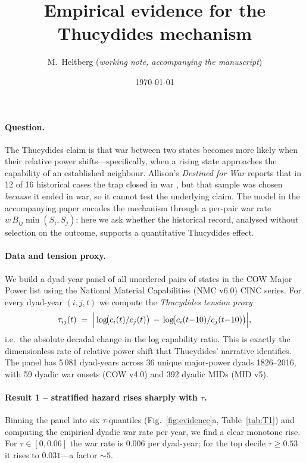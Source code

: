 \documentclass[11pt]{article}
\title{\bfseries Empirical evidence for the Thucydides mechanism}
\author{M.~Heltberg \quad \small (\textit{working note, accompanying the manuscript})}
\date{\today}
\begin{document}
\maketitle

\paragraph*{Question.}
The Thucydides claim is that war between two states becomes more
likely when their relative power shifts---specifically, when a rising
state approaches the capability of an established neighbour. Allison's
\emph{Destined for War} reports that in 12 of 16 historical cases the
trap closed in war \cite{Allison}, but that sample was chosen \emph{because}
it ended in war, so it cannot test the underlying claim. The model in
the accompanying paper encodes the mechanism through a per-pair war rate
$w\,B_{ij}\min(S_i,S_j)$; here we ask whether the historical record,
analysed without selection on the outcome, supports a quantitative
Thucydides effect.

\paragraph*{Data and tension proxy.}
We build a dyad-year panel of all unordered pairs of states in the COW
Major Power list \cite{COW} using the National Material Capabilities
(NMC v6.0) CINC series. For every dyad-year $(i,j,t)$ we compute the
\emph{Thucydides tension proxy}
\begin{equation}
\tau_{ij}(t) \;=\;
\Bigl|\,\log\!\bigl(c_i(t)/c_j(t)\bigr)\,-\,\log\!\bigl(c_i(t{-}10)/c_j(t{-}10)\bigr)\Bigr|,
\label{eq:tau}
\end{equation}
i.e.\ the absolute decadal change in the log capability ratio. This is
exactly the dimensionless rate of relative power shift that Thucydides'
narrative identifies. The panel has 5\,081 dyad-years across 36 unique
major-power dyads 1826--2016, with 59 dyadic war onsets (COW v4.0) and
392 dyadic MIDs (MID v5).

\paragraph*{Result 1 -- stratified hazard rises sharply with $\tau$.}
Binning the panel into six $\tau$-quantiles
(Fig.~\ref{fig:evidence}a, Table~\ref{tab:T1}) and computing the empirical
dyadic war rate per year, we find a clear monotone rise.
For $\tau\!\in[0,0.06]$ the war rate is $0.006$ per dyad-year; for the
top decile $\tau\!\geq\!0.53$ it rises to $0.031$---a factor $\sim 5$.
\end{document}
